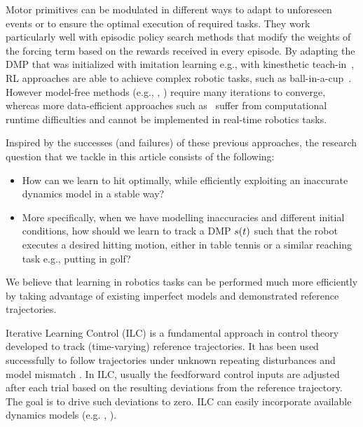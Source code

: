 Motor primitives can be modulated in different ways to adapt to unforeseen events or to ensure the optimal execution of required tasks. They work particularly well with episodic policy search methods that modify the weights of the forcing term based on the rewards received in every episode. By adapting the DMP that was initialized with imitation learning e.g., with kinesthetic teach-in~\cite{Muelling13}, RL approaches are able to achieve complex robotic tasks, such as ball-in-a-cup~\cite{Kober09}. However model-free methods (e.g., \cite{Kober08}, \cite{Peter10}) require many iterations to converge, whereas more data-efficient approaches such as~\cite{Deisenroth11} suffer from computational runtime difficulties and cannot be implemented in real-time robotics tasks. %

Inspired by the successes (and failures) of these previous approaches, the research question that we tackle in this article consists of the following:
%
\begin{itemize}
\item How can we learn to hit optimally, while efficiently exploiting an inaccurate dynamics model in a stable way?
%
\item More specifically, when we have modelling inaccuracies and different initial conditions, how should we learn to track a DMP $s(t)$ such that the robot executes a desired hitting motion, either in table tennis or a similar reaching task e.g., putting in golf?

\end{itemize}
%
%
\noindent We believe that learning in robotics tasks can be performed much more efficiently by taking advantage of existing imperfect models and demonstrated reference trajectories. 

Iterative Learning Control (ILC) is a fundamental approach in control theory developed to track (time-varying) reference trajectories. It has been used successfully to follow trajectories under unknown repeating disturbances and model mismatch \cite{Bristow06}. In ILC, usually the feedforward control inputs are adjusted after each trial based on the resulting deviations from the reference trajectory. The goal is to drive such deviations to zero. ILC can easily incorporate available dynamics models (e.g. \cite{Moore07}, \cite{Amann95}).

